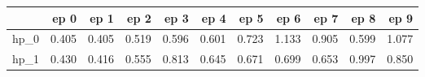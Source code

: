 \begin{tabular}{lrrrrrrrrrr}
\toprule
{} &   ep 0 &   ep 1 &   ep 2 &   ep 3 &   ep 4 &   ep 5 &   ep 6 &   ep 7 &   ep 8 &   ep 9 \\
\midrule
hp\_0 &  0.405 &  0.405 &  0.519 &  0.596 &  0.601 &  0.723 &  1.133 &  0.905 &  0.599 &  1.077 \\
hp\_1 &  0.430 &  0.416 &  0.555 &  0.813 &  0.645 &  0.671 &  0.699 &  0.653 &  0.997 &  0.850 \\
\bottomrule
\end{tabular}
